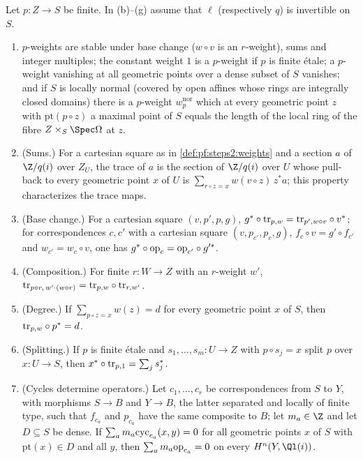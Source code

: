\begin{proposition}\label{prop:pf:steps2:traces}
Let $p\colon Z\to S$ be finite. In \textup{(b)--(g)} assume that $\ell$ (respectively $q$) is
invertible on $S$.
\begin{enumerate}[label=\textup{(\alph*)},nosep]
\item $p$-weights are stable under base change ($w\circ v$ is an $r$-weight), sums and integer
  multiples; the constant weight $1$ is a $p$-weight if $p$ is finite \'etale; a $p$-weight vanishing
  at all geometric points over a dense subset of $S$ vanishes; and if $S$ is locally normal (covered
  by open affines whose rings are integrally closed domains) there is a $p$-weight $w^{\mathrm{nor}}_p$
  which at every geometric point $z$ with $\mathrm{pt}(p\circ z)$ a maximal point of $S$ equals the
  length of the local ring of the fibre $Z\times_S\Spec\Omega$ at $z$.
\item (Sums.) For a cartesian square as in \cref{def:pf:steps2:weights} and a section $a$ of
  $\Z/q(i)$ over $Z_U$, the trace of $a$ is the section of $\Z/q(i)$ over $U$ whose pull-back to every
  geometric point $x$ of $U$ is $\sum_{r\circ z=x}w(v\circ z)\,z^\ast a$; this property characterizes
  the trace maps.
\item (Base change.) For a cartesian square $(v,p',p,g)$,
  $g^\ast\circ\mathrm{tr}_{p,w}=\mathrm{tr}_{p',w\circ v}\circ v^\ast$; for correspondences $c,c'$ with a
  cartesian square $(v,p_{c'},p_c,g)$, $f_c\circ v=g'\circ f_{c'}$ and $w_{c'}=w_c\circ v$, one has
  $g^\ast\circ\mathrm{op}_c=\mathrm{op}_{c'}\circ g'^\ast$.
\item (Composition.) For finite $r\colon W\to Z$ with an $r$-weight $w'$,
  $\mathrm{tr}_{p\circ r,\,w'\cdot(w\circ r)}=\mathrm{tr}_{p,w}\circ\mathrm{tr}_{r,w'}$.
\item (Degree.) If $\sum_{p\circ z=x}w(z)=d$ for every geometric point $x$ of $S$, then
  $\mathrm{tr}_{p,w}\circ p^\ast=d$.
\item (Splitting.) If $p$ is finite \'etale and $s_1,\dots,s_m\colon U\to Z$ with $p\circ s_j=x$ split
  $p$ over $x\colon U\to S$, then $x^\ast\circ\mathrm{tr}_{p,1}=\sum_js_j^\ast$.
\item (Cycles determine operators.) Let $c_1,\dots,c_r$ be correspondences from $S$ to $Y$, with
  morphisms $S\to B$ and $Y\to B$, the latter separated and locally of finite type, such that $f_{c_a}$
  and $p_{c_a}$ have the same composite to $B$; let $m_a\in\Z$ and let $D\subseteq S$ be dense. If
  $\sum_am_a\mathrm{cyc}_{c_a}(x,y)=0$ for all geometric points $x$ of $S$ with $\mathrm{pt}(x)\in D$
  and all $y$, then $\sum_am_a\mathrm{op}_{c_a}=0$ on every $H^n(Y,\Ql(i))$.
\end{enumerate}
\end{proposition}

